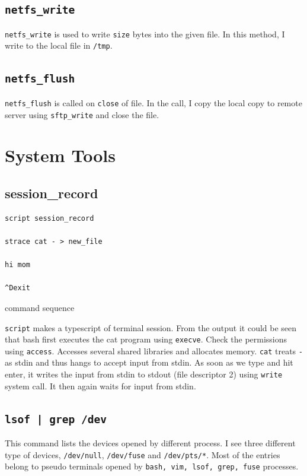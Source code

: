 \documentclass[10pt] {article}
\begin{document}
\subsection {\texttt{netfs\_write}}
\texttt{netfs\_write} is used to write \texttt{size} bytes into the given file. In this method, I write to the local file in \texttt{/tmp}.

\subsection {\texttt{netfs\_flush}}
\texttt{netfs\_flush} is called on \texttt{close} of file. In the call, I copy the local copy to remote server using \texttt{sftp\_write} and close the file.

\section {System Tools}

\subsection {session\_record}
\begin{listing}[ht!]
\begin{verbatim}
script session_record

strace cat - > new_file

hi mom

^Dexit

\end{verbatim}
\label{lst:sched}
\caption{command sequence}
\end{listing}

\texttt{script} makes a typescript of terminal session. From the output it could be seen that bash first executes the cat program using \texttt{execve}. Check the permissions using \texttt{access}. Accesses several shared libraries and allocates memory. \texttt{cat} treats \texttt{-} as stdin and thus hangs to accept input from stdin. As soon as we type and hit enter, it writes the input from stdin to stdout (file descriptor 2) using \texttt{write} system call. It then again waits for input from stdin.

\subsection {\texttt{lsof | grep /dev}}
This command lists the devices  opened by different process. I see three different type of devices, \texttt{/dev/null}, \texttt{/dev/fuse} and \texttt{/dev/pts/*}. Most of the entries belong to pseudo terminals opened by \texttt{bash, vim, lsof, grep, fuse} processes.
\end{document}
